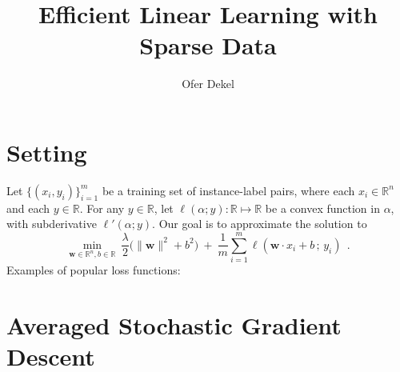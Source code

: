 \documentclass{article}
\title{Efficient Linear Learning with Sparse Data}
\author{Ofer Dekel}
\newcommand{\reals}{\mathbb{R}}
\newcommand{\norm}[1]{\|#1\|}
\newcommand{\bw}{\mathbf{w}}
\begin{document}
\maketitle

\section{Setting}

Let $\{(x_i,y_i)\}_{i=1}^m$ be a training set of instance-label pairs,
where each $x_i \in \reals^n$ and each $y \in \reals$.  For any $y \in
\reals$, let $\ell(\alpha ; y) : \reals \mapsto \reals$ be a convex
function in $\alpha$, with subderivative $\ell'(\alpha ; y)$. Our goal
is to approximate the solution to
\begin{equation}\label{eqn:objective}
\min_{\bw \in \reals^n, b \in \reals} ~ \frac{\lambda}{2} \big( \norm{\bw}^2 + b^2 \big) ~+~ \frac{1}{m}\sum_{i=1}^m \ell(\bw \cdot x_i + b\,;\, y_i)~~.
\end{equation}
%
Examples of popular loss functions:

\begin{center}
\end{center}

\section{Averaged Stochastic Gradient Descent}
\end{document}
